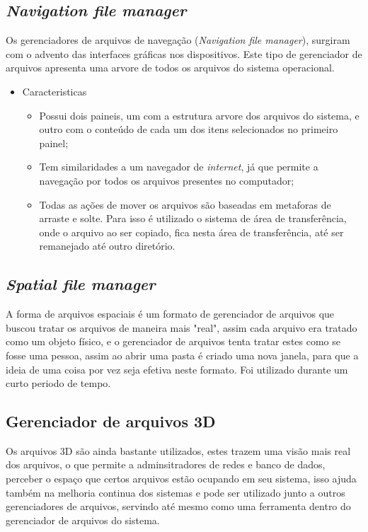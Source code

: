 \documentclass[12pt,a4paper,openany,oneside]{abntex2}
\begin{document}
\subsection{\textit{Navigation file manager}}

Os gerenciadores de arquivos de navegação (\textit{Navigation file manager}), surgiram com o advento das interfaces gráficas nos dispositivos. Este tipo de gerenciador de arquivos apresenta uma arvore de todos os arquivos do sistema operacional.

\begin{itemize}
	\item Caracteristicas
	\begin{itemize}
	\item Possui dois paineis, um com a estrutura arvore dos arquivos do sistema, e outro com o conteúdo de cada um dos itens selecionados no primeiro painel;
	\item Tem similaridades a um navegador de \textit{internet}, já que permite a navegação por todos os arquivos presentes no computador;
	\item Todas as ações de mover os arquivos são baseadas em metaforas de arraste e solte. Para isso é utilizado o sistema de área de transferência, onde o arquivo ao ser copiado, fica nesta área de transferência, até ser remanejado até outro diretório.
	\end{itemize}
\end{itemize}

\subsection{\textit{Spatial file manager}}

A forma de arquivos espaciais é um formato de gerenciador de arquivos que buscou tratar os arquivos de maneira mais "real", assim cada arquivo era tratado como um objeto físico, e o gerenciador de arquivos tenta tratar estes como se fosse uma pessoa, assim ao abrir uma pasta é criado uma nova janela, para que a ideia de uma coisa por vez seja efetiva neste formato. Foi utilizado durante um curto periodo de tempo.

\subsection{Gerenciador de arquivos 3D}

Os arquivos 3D são ainda bastante utilizados, estes trazem uma visão mais real dos arquivos, o que permite a adminsitradores de redes e banco de dados, perceber o espaço que certos arquivos estão ocupando em seu sistema, isso ajuda também na melhoria continua dos sistemas e pode ser utilizado junto a outros  gerenciadores de arquivos, servindo até mesmo como uma ferramenta dentro do gerenciador de arquivos do sistema.
\end{document}
